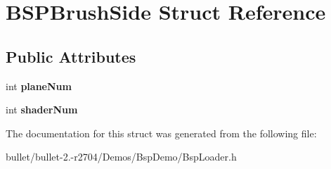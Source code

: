 \hypertarget{struct_b_s_p_brush_side}{\section{B\+S\+P\+Brush\+Side Struct Reference}
\label{struct_b_s_p_brush_side}
}
\subsection*{Public Attributes}
\begin{DoxyCompactItemize}
\item 
\hypertarget{struct_b_s_p_brush_side_afde1587f871d80d29da8c1f5f1f01fe2}{int {\bfseries plane\+Num}}\label{struct_b_s_p_brush_side_afde1587f871d80d29da8c1f5f1f01fe2}

\item 
\hypertarget{struct_b_s_p_brush_side_a1b63f405a3b74c813d36735d85b96bda}{int {\bfseries shader\+Num}}\label{struct_b_s_p_brush_side_a1b63f405a3b74c813d36735d85b96bda}

\end{DoxyCompactItemize}


The documentation for this struct was generated from the following file\+:\begin{DoxyCompactItemize}
\item 
bullet/bullet-\/2.-\/r2704/\+Demos/\+Bsp\+Demo/Bsp\+Loader.\+h\end{DoxyCompactItemize}
